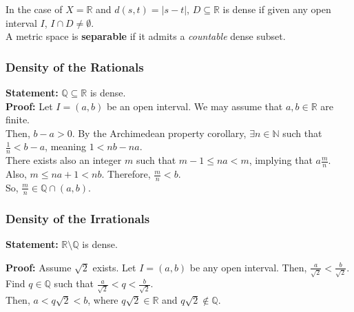 \documentclass[10pt]{extarticle}
\newcommand{\N}{\mathbb{N}}
\newcommand{\Q}{\mathbb{Q}}
\newcommand{\R}{\mathbb{R}}
\begin{document}
    In the case of $X = \R$ and $d(s,t) = |s-t|$, $D\subseteq \R$ is dense if given any open interval $I$, $I\cap D \neq \emptyset$.\\

    A metric space is \textbf{separable} if it admits a \textsl{countable} dense subset.
    \subsubsection{Density of the Rationals}%
    \textbf{Statement:} $\Q\subseteq\R$ is dense.\\

    \textbf{Proof:} Let $I = (a,b)$ be an open interval. We may assume that $a,b\in\R$ are finite.\\

      Then, $b-a > 0$. By the Archimedean property corollary, $\exists n\in\N$ such that $\frac{1}{n} < b-a$, meaning $1 < nb-na$.\\

      There exists also an integer $m$ such that $m-1 \leq na < m$, implying that $a \frac{m}{n}$. Also, $m \leq na+1 < nb$. Therefore, $\frac{m}{n} < b$.\\

      So, $\frac{m}{n}\in \Q\cap (a,b)$.
    \subsubsection{Density of the Irrationals}%
    \textbf{Statement:} $\R\setminus\Q$ is dense.

    \textbf{Proof:} Assume $\sqrt{2}$ exists. Let $I = (a,b)$ be any open interval. Then, $\frac{a}{\sqrt{2}} < \frac{b}{\sqrt{2}}$.\\

      Find $q\in\Q$ such that $\frac{a}{\sqrt{2}} < q < \frac{b}{\sqrt{2}}$.\\

      Then, $a < q\sqrt{2} < b$, where $q\sqrt{2} \in\R$ and $q\sqrt{2}\notin\Q$.
\end{document}
